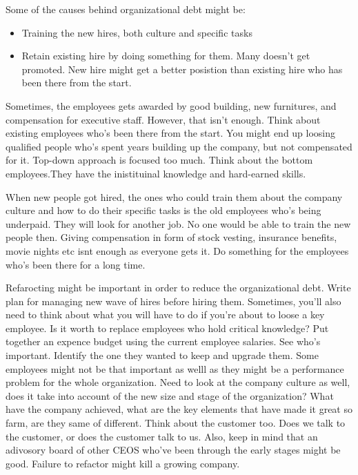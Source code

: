 Some of the causes behind organizational debt might be:

\begin{itemize}
	\item Training the new hires, both culture and specific tasks
	\item Retain existing hire by doing something for them. Many doesn't get promoted. New hire might get a better posistion than existing hire who has been there from the start.
\end{itemize}

Sometimes, the employees gets awarded by good building, new furnitures, and compensation for executive staff. However, that isn't enough. Think about existing employees who's been there from the start. You might end up loosing qualified people who's spent years building up the company, but not compensated for it. Top-down approach is focused too much. Think about the bottom employees.They have the inistituinal knowledge and hard-earned skills.

When new people got hired, the ones who could train them about the company culture and how to do their specific tasks is the old employees who's being underpaid. They will look for another job. No one would be able to train the new people then. Giving compensation in form of stock vesting, insurance benefits, movie nights etc isnt enough as everyone gets it. Do something for the employees who's been there for a long time.

Refarocting might be important in order to reduce the organizational debt. Write plan for managing new wave of hires before hiring them. Sometimes, you'll also need to think about what you will have to do if you're about to loose a key employee. Is it worth to replace employees who hold critical knowledge? Put together an expence budget using the current employee salaries. See who's important. Identify the one they wanted to keep and upgrade them. Some employees might not be that important as welll as they might be a performance problem for the whole organization. Need to look at the company culture as well, does it take into account of the new size and stage of the organization? What have the company achieved, what are the key elements that have made it great so farm, are they same of different. Think about the customer too. Does we talk to the customer, or does the customer talk to us. Also, keep in mind that an adivosory board of other CEOS who've been through the early stages might be good. Failure to refactor might kill a growing company\cite{steve-blank}.

